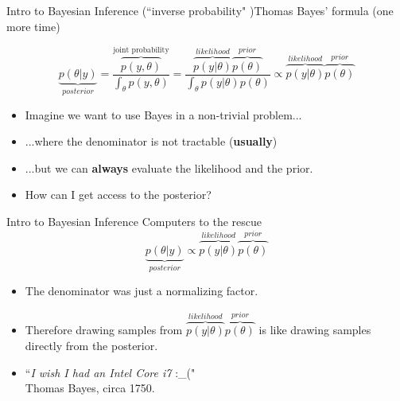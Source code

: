\documentclass{beamer}
\begin{document}
\begin{frame}{Intro to Bayesian Inference (``inverse probability" )}{Thomas Bayes' formula (one more time)}
	
	\begin{equation}
	\underbrace{p(\theta | y)}_{posterior} 
	= 
	\frac{\overbrace{p(y, \theta)}^{\text{joint probability}}}{\int_\theta p(y, \theta)}
	=
	\frac{\overbrace{p(y | \theta)}^{likelihood} \overbrace{p(\theta)}^{prior}}{\int_\theta p(y | \theta) p(\theta)}
	\propto 
	\overbrace{p(y | \theta)}^{likelihood} \overbrace{p(\theta)}^{prior}
	\end{equation}
	\begin{itemize}
		\item Imagine we want to use Bayes in a non-trivial problem...
		\item ...where the denominator is not tractable (\textbf{usually})
		\item ...but we can \textbf{always} evaluate the likelihood and the prior.
		\item How can I get access to the posterior? 
	\end{itemize}
\end{frame}


\begin{frame}{Intro to Bayesian Inference }{Computers to the rescue}
		\begin{equation}
		\underbrace{p(\theta | y)}_{posterior} 
		\propto 
		\overbrace{p(y | \theta)}^{likelihood} \overbrace{p(\theta)}^{prior}
		\end{equation}
		\begin{itemize}
			\item The denominator was just a normalizing factor.
			\item Therefore drawing samples from $\overbrace{p(y | \theta)}^{likelihood} \overbrace{p(\theta)}^{prior}$ is like drawing samples directly from the posterior.
			\item ``\textit{I wish I had an Intel Core i7} :\_(" \\Thomas Bayes, circa 1750.
		\end{itemize}
\end{frame}
\end{document}

